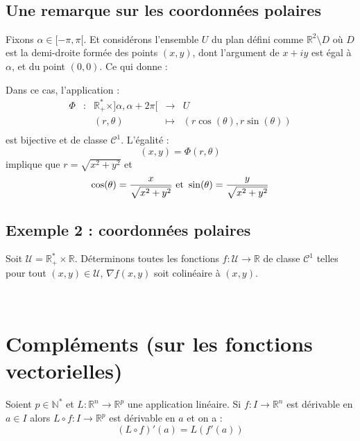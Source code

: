 \documentclass[a4paper,10pt]{report}
\begin{document}
\newpage

$\phantom{}$
\vspace{10cm}


\subsection{Une remarque sur les coordonnées polaires}
\noindent Fixons $\alpha \in [-\pi,\pi[$. Et considérons l'ensemble $U$ du plan défini comme $\mathbb{R}^2 \setminus D$ où $D$ est la demi-droite formée des points $(x,y)$, dont l'argument de $x+iy$ est égal à $\alpha$, et du point $(0,0)$. Ce qui donne :

\vspace{3cm}

\noindent Dans ce cas, l'application :
$$ \begin{array}{cccll}
\Phi & : & \mathbb{R}_+^{*} \times ]\alpha, \alpha + 2 \pi[ & \rightarrow & U \\
& & (r, \theta) & \mapsto & (r \cos(\theta), r \sin(\theta)) \\
\end{array}$$
est bijective et de classe $\mathcal{C}^1$. L'égalité :
$$ (x,y) = \Phi(r ,\theta)$$ implique que $r= \sqrt{x^2+y^2}$ et 
$$ \cos(\theta) = \dfrac{x}{\sqrt{x^2+y^2}} \hbox{ et } \sin(\theta) = \dfrac{y}{\sqrt{x^2+y^2}} $$

\subsection{Exemple 2 : coordonnées polaires}
\noindent Soit $\mathcal{U} = \mathbb{R}_+^{*} \times \mathbb{R}$. Déterminons toutes les fonctions $f : \mathcal{U} \rightarrow \mathbb{R}$ de classe $\mathcal{C}^1$ telles pour tout $(x,y) \in \mathcal{U}$, $\nabla f (x,y)$ soit colinéaire à $(x,y)$.
\newpage

$\phantom{test}$

\vspace{10cm}

\section{Compléments (sur les fonctions vectorielles)}

\begin{prop}
Soient $p \in \mathbb{N}^*$ et $L : \mathbb{R}^n \rightarrow \mathbb{R}^p$ une application linéaire. Si $f : I \rightarrow \mathbb{R}^n$ est dérivable en $a \in I$ alors $L \circ f : I \rightarrow \mathbb{R}^p$ est dérivable en $a$ et on a :
$$ (L \circ f)'(a) = L (f'(a))$$
\end{prop}
\end{document}
